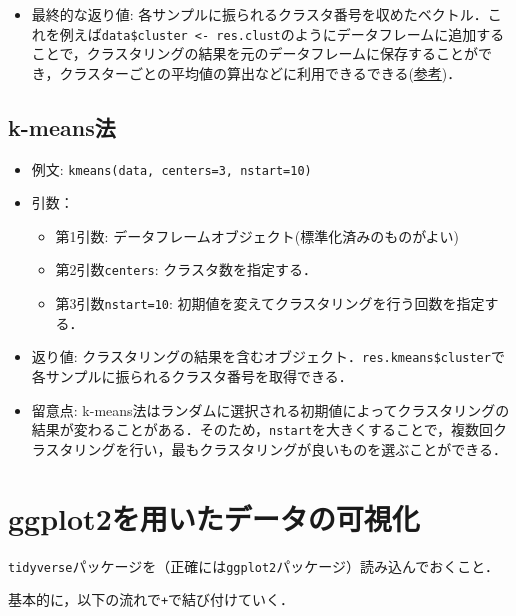 \documentclass[
  xelatex, ja=standard]{bxjsarticle}
\providecommand{\tightlist}{%
  \setlength{\itemsep}{0pt}\setlength{\parskip}{0pt}}
\begin{document}
\begin{itemize}
\tightlist
\item
  最終的な返り値:
  各サンプルに振られるクラスタ番号を収めたベクトル．これを例えば\texttt{data\$cluster\ \textless{}-\ res.clust}のようにデータフレームに追加することで，クラスタリングの結果を元のデータフレームに保存することができ，クラスターごとの平均値の算出などに利用できるできる(\hyperref[ux30b0ux30ebux30fcux30d7ux3054ux3068ux306eux8a18ux8ff0ux7d71ux8a08ux91cfux3092ux5f97ux308b]{参考})．
\end{itemize}

\subsection{k-means法}\label{k-meansux6cd5}

\begin{itemize}
\tightlist
\item
  例文: \texttt{kmeans(data,\ centers=3,\ nstart=10)}
\item
  引数：

  \begin{itemize}
  \tightlist
  \item
    第1引数: データフレームオブジェクト(標準化済みのものがよい)
  \item
    第2引数\texttt{centers}: クラスタ数を指定する．
  \item
    第3引数\texttt{nstart=10}:
    初期値を変えてクラスタリングを行う回数を指定する．
  \end{itemize}
\item
  返り値:
  クラスタリングの結果を含むオブジェクト．\texttt{res.kmeans\$cluster}で各サンプルに振られるクラスタ番号を取得できる．
\item
  留意点:
  k-means法はランダムに選択される初期値によってクラスタリングの結果が変わることがある．そのため，\texttt{nstart}を大きくすることで，複数回クラスタリングを行い，最もクラスタリングが良いものを選ぶことができる．
\end{itemize}

\section{ggplot2を用いたデータの可視化}\label{ggplot2ux3092ux7528ux3044ux305fux30c7ux30fcux30bfux306eux53efux8996ux5316}

\texttt{tidyverse}パッケージを（正確には\texttt{ggplot2}パッケージ）読み込んでおくこと．

基本的に，以下の流れで\texttt{+}で結び付けていく．
\end{document}
